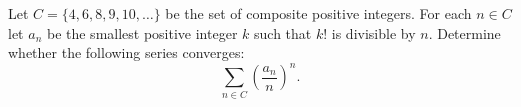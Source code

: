 Let $C=\{4,6,8,9,10,\ldots\}$ be the set of composite positive integers. For each $n\in C$ let $a_n$ be the smallest positive integer $k$ such that $k!$ is divisible by $n$. Determine whether the following series converges:
$$\sum_{n\in C}\left(\frac{a_n}{n}\right)^n.$$
